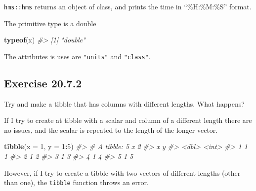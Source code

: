 \documentclass[]{book}
\newenvironment{Shaded}{\begin{snugshade}}{\end{snugshade}}
\newcommand{\CommentTok}[1]{\textcolor[rgb]{0.56,0.35,0.01}{\textit{#1}}}
\newcommand{\DataTypeTok}[1]{\textcolor[rgb]{0.13,0.29,0.53}{#1}}
\newcommand{\DecValTok}[1]{\textcolor[rgb]{0.00,0.00,0.81}{#1}}
\newcommand{\KeywordTok}[1]{\textcolor[rgb]{0.13,0.29,0.53}{\textbf{#1}}}
\newcommand{\NormalTok}[1]{#1}
\newcommand{\OperatorTok}[1]{\textcolor[rgb]{0.81,0.36,0.00}{\textbf{#1}}}
\theoremstyle{plain}
\theoremstyle{remark}
\begin{document}
\texttt{hms::hms} returns an object of class, and prints the time in
``\%H:\%M:\%S'' format.

The primitive type is a double

\begin{Shaded}
\begin{Highlighting}[]
\KeywordTok{typeof}\NormalTok{(x)}
\CommentTok{#> [1] "double"}
\end{Highlighting}
\end{Shaded}

The attributes is uses are \texttt{"units"} and \texttt{"class"}.

\begin{Shaded}
\end{Shaded}

\hypertarget{exercise-20.7.2}{%
\subsection*{\texorpdfstring{Exercise
{20.7.2}}{Exercise 20.7.2}}\label{exercise-20.7.2}}

Try and make a tibble that has columns with different lengths. What
happens?

If I try to create at tibble with a scalar and column of a different
length there are no issues, and the scalar is repeated to the length of
the longer vector.

\begin{Shaded}
\begin{Highlighting}[]
\KeywordTok{tibble}\NormalTok{(}\DataTypeTok{x =} \DecValTok{1}\NormalTok{, }\DataTypeTok{y =} \DecValTok{1}\OperatorTok{:}\DecValTok{5}\NormalTok{)}
\CommentTok{#> # A tibble: 5 x 2}
\CommentTok{#>       x     y}
\CommentTok{#>   <dbl> <int>}
\CommentTok{#> 1     1     1}
\CommentTok{#> 2     1     2}
\CommentTok{#> 3     1     3}
\CommentTok{#> 4     1     4}
\CommentTok{#> 5     1     5}
\end{Highlighting}
\end{Shaded}

However, if I try to create a tibble with two vectors of different
lengths (other than one), the \texttt{tibble} function throws an error.
\end{document}
